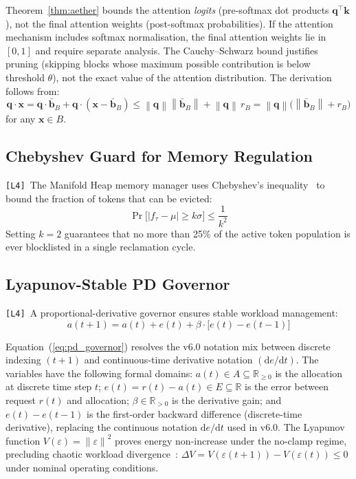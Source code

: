 \documentclass[11pt,a4paper]{article}
\theoremstyle{plain}
\theoremstyle{definition}
\theoremstyle{remark}
\newcommand{\norm}[1]{\left\|#1\right\|}
\newcommand{\abs}[1]{\left|#1\right|}
\begin{document}
\begin{correction}
Theorem~\ref{thm:aether} bounds the attention \emph{logits} (pre-softmax dot products
$\mathbf{q}^\top \mathbf{k}$), not the final attention weights (post-softmax probabilities).
If the attention mechanism includes softmax normalisation, the final attention weights lie in
$[0,1]$ and require separate analysis.  The Cauchy--Schwarz bound justifies pruning (skipping
blocks whose maximum possible contribution is below threshold $\theta$), not the exact value of
the attention distribution.  The derivation follows from:
\[
  \mathbf{q} \cdot \mathbf{x}
  = \mathbf{q} \cdot \bar{\mathbf{b}}_B + \mathbf{q} \cdot (\mathbf{x} - \bar{\mathbf{b}}_B)
  \leq \norm{\mathbf{q}}\norm{\bar{\mathbf{b}}_B} + \norm{\mathbf{q}}\,r_B
  = \norm{\mathbf{q}}\bigl(\norm{\bar{\mathbf{b}}_B} + r_B\bigr)
\]
for any $\mathbf{x} \in B$.
\end{correction}

\subsection{Chebyshev Guard for Memory Regulation}

\texttt{[L4\checkmark]}~The Manifold Heap memory manager uses Chebyshev's
inequality~\cite{chebyshev1867} to bound the fraction of tokens that can be evicted:
\begin{equation}
  \Pr\bigl[\abs{f_\tau - \mu} \geq k\sigma\bigr] \leq \frac{1}{k^2}
  \label{eq:chebyshev}
\end{equation}
Setting $k = 2$ guarantees that no more than 25\% of the active token population is ever
blocklisted in a single reclamation cycle.

\subsection{Lyapunov-Stable PD Governor}

\texttt{[L4\checkmark]}~A proportional-derivative governor ensures stable workload management:
\begin{equation}
  a(t+1) = a(t) + e(t) + \beta \cdot \bigl[e(t) - e(t-1)\bigr]
  \label{eq:pd_governor}
\end{equation}

\begin{correction}
Equation~(\ref{eq:pd_governor}) resolves the v6.0 notation mix between discrete indexing
$(t+1)$ and continuous-time derivative notation $(\mathrm{d}e/\mathrm{d}t)$.
The variables have the following formal domains:
$a(t) \in A \subseteq \mathbb{R}_{\geq 0}$ is the allocation at discrete time step $t$;
$e(t) = r(t) - a(t) \in E \subseteq \mathbb{R}$ is the error between request $r(t)$ and
allocation; $\beta \in \mathbb{R}_{>0}$ is the derivative gain; and
$e(t) - e(t-1)$ is the first-order backward difference (discrete-time derivative),
replacing the continuous notation $\mathrm{d}e/\mathrm{d}t$ used in v6.0.
The Lyapunov function $V(\varepsilon) = \norm{\varepsilon}^2$ proves energy non-increase under
the no-clamp regime, precluding chaotic workload divergence~\cite{khalil2002}:
$\Delta V = V(\varepsilon(t+1)) - V(\varepsilon(t)) \leq 0$ under nominal operating conditions.
\end{correction}
\end{document}
